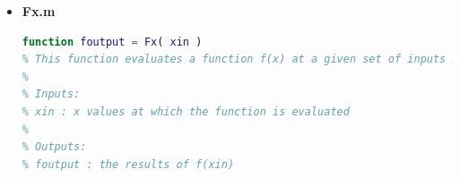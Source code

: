 \documentclass[12pt,letterpaper]{article}
\begin{document}
\begin{enumerate}
\begin{itemize}
\begin{lstlisting}[language = Matlab]
    % For the midpoint INDEX!!
    impoint = round( ( x(2) - x(1) ) / ( 2*h(i))) + 1;
    
    % Show the midpoint you are using for the current grid to verify
    % that you are using the same x at each h
    fprintf('Midpoint for h=%11.10f is x=%11.10f \n',h(i),xgrid(impoint));
    
    % Save error at midpoint
    errorh(i,1) = Error(impoint-2);
    
    %% This area needs to be coded by you
    % For the rmse
    errorh(i,2) = Error_rmse ;
    
    % For the infinity norm
    errorh(i,3) = max(Error);
    
end

% Plot your results
% Please improve this to make pretty graphs!!

tiledlayout(3,1);

nexttile
loglog(h, errorh(:,1), 'b*'); grid; grid minor;
hold on
loglog(h, errorh(:,1), 'b-')
xlabel('Grid size [h]'); ylabel('|Error_{mid}|');
hold off

nexttile
loglog(h, errorh(:,2), 'r*'); grid; grid minor;
hold on
loglog(h, errorh(:,2), 'r-')
xlabel('Grid size [h]'); ylabel('|Error RSME_{mid}|');
hold off

nexttile
loglog(h, errorh(:,3), 'g*'); grid; grid minor;
hold on
loglog(h, errorh(:,3), 'g-')
xlabel('Grid size [h]'); ylabel('|Error Infinity|');
hold off


% Verify with linear plot fitting
disp(' ' );
% Midpoint Error
Efit = polyfit( log(h), log(errorh(:,1)),1);
disp(['Midpoint: Fit is |E| = ' num2str(Efit(1)) '*h + (' num2str(Efit(2)) ')' ]);

%% You need to code the following parts
% RMSE Error
% Put code here
Efit = polyfit( log(h), log(errorh(:,2)),1) ;
disp(['RMSE: Fit is |E| = ' num2str(Efit(1)) '*h + (' num2str(Efit(2)) ')' ]);

% Infintiy Error
% Put code here
Efit = polyfit( log(h), log(errorh(:,3)),1) ;
disp(['Infinity: Fit is |E| = ' num2str(Efit(1)) '*h + (' num2str(Efit(2)) ')' ]);
\end{lstlisting}
\pagebreak
		\item \textbf{Fx.m}
        \begin{lstlisting}[language = Matlab]
function foutput = Fx( xin )
% This function evaluates a function f(x) at a given set of inputs x
%
% Inputs:
% xin : x values at which the function is evaluated
%
% Outputs:
% foutput : the results of f(xin)


\end{lstlisting}
\end{itemize}
\end{enumerate}
\end{document}
